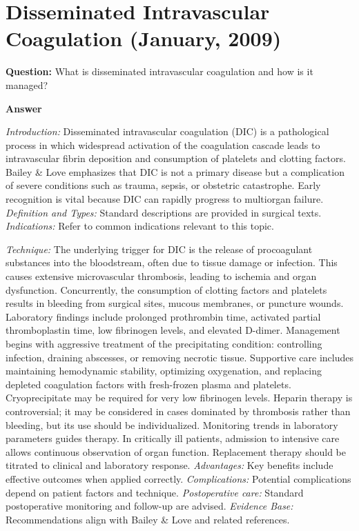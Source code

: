 \documentclass{article}
\begin{document}
\section{Disseminated Intravascular Coagulation (January, 2009)}

\textbf{Question:} What is disseminated intravascular coagulation and how is it managed?

\textbf{Answer}

\emph{Introduction:} Disseminated intravascular coagulation (DIC) is a pathological process in which widespread activation of the coagulation cascade leads to intravascular fibrin deposition and consumption of platelets and clotting factors. Bailey \& Love emphasizes that DIC is not a primary disease but a complication of severe conditions such as trauma, sepsis, or obstetric catastrophe. Early recognition is vital because DIC can rapidly progress to multiorgan failure.
\emph{Definition and Types:} Standard descriptions are provided in surgical texts.
\emph{Indications:} Refer to common indications relevant to this topic.

\emph{Technique:} The underlying trigger for DIC is the release of procoagulant substances into the bloodstream, often due to tissue damage or infection. This causes extensive microvascular thrombosis, leading to ischemia and organ dysfunction. Concurrently, the consumption of clotting factors and platelets results in bleeding from surgical sites, mucous membranes, or puncture wounds. Laboratory findings include prolonged prothrombin time, activated partial thromboplastin time, low fibrinogen levels, and elevated D-dimer. Management begins with aggressive treatment of the precipitating condition: controlling infection, draining abscesses, or removing necrotic tissue. Supportive care includes maintaining hemodynamic stability, optimizing oxygenation, and replacing depleted coagulation factors with fresh-frozen plasma and platelets. Cryoprecipitate may be required for very low fibrinogen levels. Heparin therapy is controversial; it may be considered in cases dominated by thrombosis rather than bleeding, but its use should be individualized. Monitoring trends in laboratory parameters guides therapy. In critically ill patients, admission to intensive care allows continuous observation of organ function. Replacement therapy should be titrated to clinical and laboratory response.
\emph{Advantages:} Key benefits include effective outcomes when applied correctly.
\emph{Complications:} Potential complications depend on patient factors and technique.
\emph{Postoperative care:} Standard postoperative monitoring and follow-up are advised.
\emph{Evidence Base:} Recommendations align with Bailey \& Love and related references.
\end{document}
